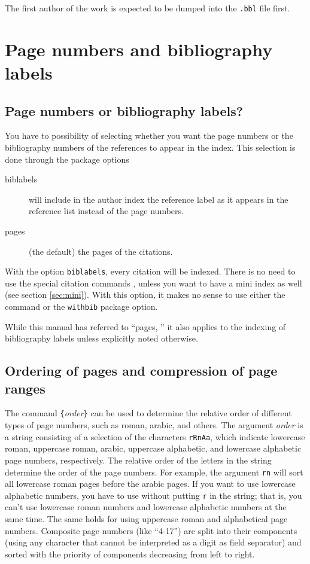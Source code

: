 \documentclass[a4paper]{article}
\newcommand{\file}[1]{\texttt{#1}}
\newcommand{\fnext}[1]{\file{.#1}}
\newcommand{\ltxinp}[1]{\texttt{\string#1}}
\begin{document}
The first author of the work is expected to be dumped into the \fnext{bbl} file
first.


\section{Page numbers and bibliography labels}

\subsection{Page numbers or bibliography labels?}

You have to possibility of selecting whether you want the page numbers or the
bibliography numbers of the references to appear in the index. This selection
is done through the package options
\begin{description}
\item[biblabels] will include in the author index the reference label as it
  appears in the reference list instead of the page numbers.
\item[pages] (the default) the pages of the citations.
\end{description}
With the option \ltxinp{biblabels}, every citation will be indexed. There is no
need to use the special citation commands \ltxinp{\aicite}, unless you want to
have a mini index as well (see section \ref{sec:mini}).  With this option, it
makes no sense to use either the \ltxinp{\aimention} command or the
\ltxinp{withbib} package option.

While this manual has referred to ``pages, '' it also applies to the indexing
of bibliography labels unless explicitly noted otherwise.


\subsection{Ordering of pages and compression of page ranges}

The command \ltxinp{\aipagetypeorder}\verb|{|\textsl{order\/}\verb|}| can be
used to determine the relative order of different types of page numbers, such
as roman, arabic, and others. The argument \textsl{order\/} is a string
consisting of a selection of the characters \ltxinp{rRnAa}, which indicate
lowercase roman, uppercase roman, arabic, uppercase alphabetic, and lowercase
alphabetic page numbers, respectively. The relative order of the letters in the
string determine the order of the page numbers. For example, the argument
\ltxinp{rn} will sort all lowercase roman pages before the arabic pages. If you
want to use lowercase alphabetic numbers, you have to use
\ltxinp{\aipagetypeorder} without putting \ltxinp{r} in the string; that is,
you can't use lowercase roman numbers and lowercase alphabetic numbers at the
same time. The same holds for using uppercase roman and alphabetical page
numbers. Composite page numbers (like ``4-17'') are split into their components
(using any character that cannot be interpreted as a digit as field separator)
and sorted with the priority of components decreasing from left to right.
\end{document}
